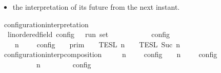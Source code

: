 \begin{isabellebody}
\begin{isamarkuptext}
\begin{itemize}
\item the interpretation of its future from the next instant.%
\end{itemize}%
\end{isamarkuptext}\isamarkuptrue%
\isamarkupfalse%
\ configuration{\isacharunderscore}interpretation\isanewline
\ \ {\isacharcolon}{\isacharcolon}{\isacartoucheopen}{\isacharprime}{\isasymtau}{\isacharcolon}{\isacharcolon}linordered{\isacharunderscore}field\ config\ {\isasymRightarrow}\ {\isacharprime}{\isasymtau}\ run\ set{\isacartoucheclose}\ \ \ \ \ \ \ \ \ \ {\isacharparenleft}{\isacartoucheopen}{\isasymlbrakk}\ {\isacharunderscore}\ {\isasymrbrakk}\isactrlsub c\isactrlsub o\isactrlsub n\isactrlsub f\isactrlsub i\isactrlsub g{\isacartoucheclose}\ {}{}{\isacharparenright}\isanewline
{}\isanewline
\ \ {\isacartoucheopen}{\isasymlbrakk}\ {\isasymGamma}{\isacharcomma}\ n\ {\isasymturnstile}\ {\isasymPsi}\ {\isasymtriangleright}\ {\isasymPhi}\ {\isasymrbrakk}\isactrlsub c\isactrlsub o\isactrlsub n\isactrlsub f\isactrlsub i\isactrlsub g\ {\isacharequal}\ {\isasymlbrakk}{\isasymlbrakk}\ {\isasymGamma}\ {\isasymrbrakk}{\isasymrbrakk}\isactrlsub p\isactrlsub r\isactrlsub i\isactrlsub m\ {\isasyminter}\ {\isasymlbrakk}{\isasymlbrakk}\ {\isasymPsi}\ {\isasymrbrakk}{\isasymrbrakk}\isactrlsub T\isactrlsub E\isactrlsub S\isactrlsub L\isactrlbsup {\isasymge}\ n\isactrlesup \ {\isasyminter}\ {\isasymlbrakk}{\isasymlbrakk}\ {\isasymPhi}\ {\isasymrbrakk}{\isasymrbrakk}\isactrlsub T\isactrlsub E\isactrlsub S\isactrlsub L\isactrlbsup {\isasymge}\ Suc\ n\isactrlesup {\isacartoucheclose}\isanewline
\isanewline
{}\isamarkupfalse%
\ configuration{\isacharunderscore}interp{\isacharunderscore}composition{\isacharcolon}\isanewline
\ \ \ {\isacartoucheopen}{\isasymlbrakk}\ {\isasymGamma}\ n\ {\isasymturnstile}\ {\isasymPsi}\ {\isasymtriangleright}\ {\isasymPhi}\ {\isasymrbrakk}\isactrlsub c\isactrlsub o\isactrlsub n\isactrlsub f\isactrlsub i\isactrlsub g\ {\isasyminter}\ {\isasymlbrakk}\ {\isasymGamma}\ n\ {\isasymturnstile}\ {\isasymPsi}\ {\isasymtriangleright}\ {\isasymPhi}\ {\isasymrbrakk}\isactrlsub c\isactrlsub o\isactrlsub n\isactrlsub f\isactrlsub i\isactrlsub g\isanewline
\ \ \ \ \ {\isacharequal}\ {\isasymlbrakk}\ {\isacharparenleft}{\isasymGamma}\ {\isacharat}\ {\isasymGamma}\ n\ {\isasymturnstile}\ {\isacharparenleft}{\isasymPsi}\ {\isacharat}\ {\isasymPsi}\ {\isasymtriangleright}\ {\isacharparenleft}{\isasymPhi}\ {\isacharat}\ {\isasymPhi}\ {\isasymrbrakk}\isactrlsub c\isactrlsub o\isactrlsub n\isactrlsub f\isactrlsub i\isactrlsub g{\isacartoucheclose}\isanewline

\end{isabellebody}

